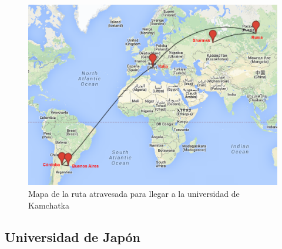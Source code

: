 \begin{figure}[H]
	\begin{center}
		  \includegraphics[scale=0.4]{../mapas/mapa_kamgu.png}
		  \caption{Mapa de la ruta atravesada para llegar a la universidad de Kamchatka}
		  \label{fig:contra1}
	\end{center}
\end{figure}

\subsection{Universidad de Japón}

